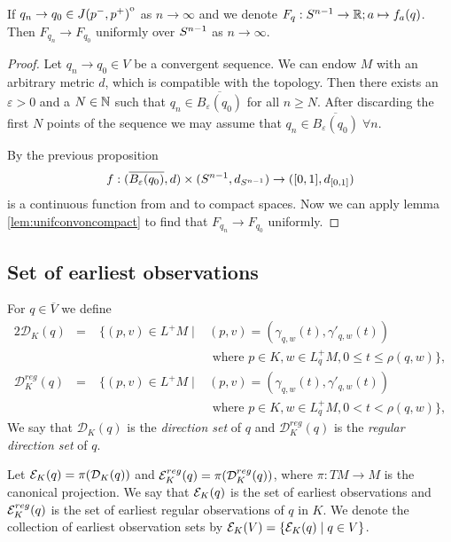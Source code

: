 \begin{proposition}\label{prop:funif}
    If $q_n \to q_0\in {\kern0ptJ(p^-,p^+)}^{\mathrm{o}}$ as $n\to \infty$ and we denote $F_q:{S^{n-1}}\to\mathbb{R};a\mapsto f_a(q)$. Then $F_{q_n}\to F_{q_0}$ uniformly over ${S^{n-1}}$ as $n\to \infty$.
\end{proposition}
\begin{proof}
    Let $q_n \to q_0 \in V$ be a convergent sequence. We can endow $M$ with an arbitrary metric $d$, which is compatible with the topology. Then there exists an $\varepsilon>0$ and a $N\in \mathbb{N}$ such that $q_n\in \overline{B_\varepsilon(q_0)}$ for all $n\ge N$. After discarding the first $N$ points of the sequence we may assume that $q_n \in \overline{B_\varepsilon(q_0)} \; \forall n$.

    By the previous proposition 
    \begin{align*}
        f:(\overline{B_\varepsilon(q_0)},d)\times({S^{n-1}}, d_{{S^{n-1}}}) \to ([0,1],d_{[0,1]})
    \end{align*} is a continuous function from and to compact spaces. Now we can apply lemma \ref{lem:unifconvoncompact} to find that $F_{q_n}\to F_{q_0}$ uniformly.
     
\end{proof}

\subsection{Set of earliest observations}
\begin{definition}
For $q\in \overline{V}$ we define
\begin{alignat*}{2}
    \mathcal{D}_K(q) &=\; &\{(p,v)\in L^+M \mid &(p,v) = (\gamma_{q,w}(t),\gamma'_{q,w}(t)) \\
    &&&\text{ where } p\in K, w\in L_q^+M, 0\leq t \leq \rho(q,w)\},\\
    \mathcal{D}^{reg}_K(q) &=\; &\{(p,v)\in L^+M \mid &(p,v) = (\gamma_{q,w}(t),\gamma'_{q,w}(t)) \\
    &&&\text{ where } p\in K, w\in L_q^+M, 0 < t < \rho(q,w)\},
\end{alignat*}
We say that $\mathcal{D}_K(q)$ is the \emph{direction set} of $q$ and $\mathcal{D}^{reg}_K(q)$ is the \emph{regular direction set} of $q$.

Let ${\mathcal{E}}_K(q) = \pi(\mathcal{D}_K(q))$ and ${\mathcal{E}}^{reg}_K(q) = \pi(\mathcal{D}^{reg}_K(q))$, where $\pi:TM\to M$ is the canonical projection. We say that ${\mathcal{E}}_K(q)$ is the set of earliest observations and ${\mathcal{E}}^{reg}_K(q)$ is the set of earliest regular observations of $q$ in $K$. We denote the collection of earliest observation sets by ${\mathcal{E}}_K(V) = \{ {\mathcal{E}}_K(q) \mid q\in V\}$.
\end{definition}

